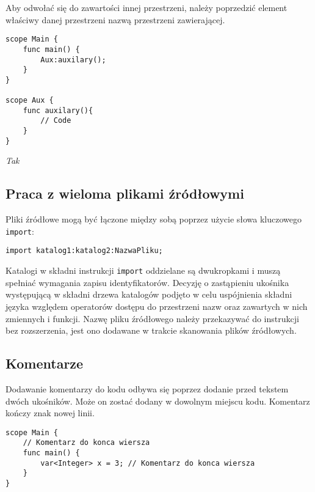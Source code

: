 Aby odwołać się do zawartości innej przestrzeni, należy poprzedzić element właściwy danej przestrzeni nazwą przestrzeni zawierającej.
\begin{lstlisting}
scope Main {
	func main() {
		Aux:auxilary();	
	}
}

scope Aux {
	func auxilary(){
		// Code
	}
}
\end{lstlisting}
 \textit{Tak}

\subsection{Praca z wieloma plikami źródłowymi}
Pliki źródłowe mogą być łączone między sobą poprzez użycie słowa kluczowego \lstinline|import|:
\begin{lstlisting}
import katalog1:katalog2:NazwaPliku;
\end{lstlisting}
Katalogi w składni instrukcji \lstinline|import| oddzielane są dwukropkami i muszą spełniać wymagania zapisu identyfikatorów. Decyzję o zastąpieniu ukośnika występującą w składni drzewa katalogów podjęto w celu uspójnienia składni języka względem operatorów dostępu do przestrzeni nazw oraz zawartych w nich zmiennych i funkcji. Nazwę pliku źródłowego należy przekazywać do instrukcji bez rozszerzenia, jest ono dodawane w trakcie skanowania plików źródłowych. 

\subsection{Komentarze}
Dodawanie komentarzy do kodu odbywa się poprzez dodanie przed tekstem dwóch ukośników. Może on zostać dodany w dowolnym miejscu kodu. Komentarz kończy znak nowej linii.
\begin{lstlisting}
scope Main {
	// Komentarz do konca wiersza
	func main() {
		var<Integer> x = 3; // Komentarz do konca wiersza
	}
}
\end{lstlisting}


